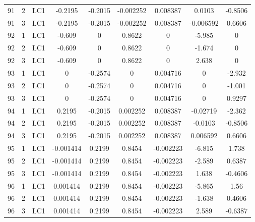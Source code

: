 \documentclass{article}%
\begin{document}
\begin{longtable}{| c c c | c c c c c c |}
91&2&LC1&{-}0.2195&{-}0.2015&{-}0.002252&0.008387&0.0103&{-}0.8506\\%
91&3&LC1&{-}0.2195&{-}0.2015&{-}0.002252&0.008387&{-}0.006592&0.6606\\%
92&1&LC1&{-}0.609&0&0.8622&0&{-}5.985&0\\%
92&2&LC1&{-}0.609&0&0.8622&0&{-}1.674&0\\%
92&3&LC1&{-}0.609&0&0.8622&0&2.638&0\\%
93&1&LC1&0&{-}0.2574&0&0.004716&0&{-}2.932\\%
93&2&LC1&0&{-}0.2574&0&0.004716&0&{-}1.001\\%
93&3&LC1&0&{-}0.2574&0&0.004716&0&0.9297\\%
94&1&LC1&0.2195&{-}0.2015&0.002252&0.008387&{-}0.02719&{-}2.362\\%
94&2&LC1&0.2195&{-}0.2015&0.002252&0.008387&{-}0.0103&{-}0.8506\\%
94&3&LC1&0.2195&{-}0.2015&0.002252&0.008387&0.006592&0.6606\\%
95&1&LC1&{-}0.001414&0.2199&0.8454&{-}0.002223&{-}6.815&1.738\\%
95&2&LC1&{-}0.001414&0.2199&0.8454&{-}0.002223&{-}2.589&0.6387\\%
95&3&LC1&{-}0.001414&0.2199&0.8454&{-}0.002223&1.638&{-}0.4606\\%
96&1&LC1&0.001414&0.2199&0.8454&{-}0.002223&{-}5.865&1.56\\%
96&2&LC1&0.001414&0.2199&0.8454&{-}0.002223&{-}1.638&0.4606\\%
96&3&LC1&0.001414&0.2199&0.8454&{-}0.002223&2.589&{-}0.6387\\%
\end{longtable}%
\end{document}

